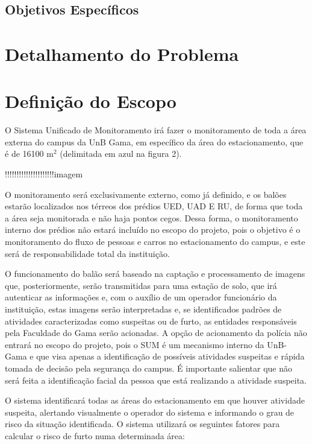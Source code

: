   \subsection{Objetivos Específicos} %
  \label{sub:objetivos_espec_ficos}


\section{Detalhamento do Problema} %
\label{sec:detalhamentoProblema}

\section{Definição do Escopo} %
\label{sec:defini_o_do_escopo}


  O Sistema Unificado de Monitoramento irá fazer o monitoramento de toda a área externa do campus da UnB Gama, em específico da área do estacionamento, que é de 16100 m$^2$ (delimitada em azul na figura 2).

  !!!!!!!!!!!!!!!!!!!!!imagem

  O monitoramento será exclusivamente externo, como já definido, e os balões estarão localizados nos térreos dos prédios UED, UAD E RU, de forma que toda a área seja monitorada e não haja pontos cegos. Dessa forma, o monitoramento interno dos prédios não estará incluído no escopo do projeto, pois o objetivo é o monitoramento do fluxo de pessoas e carros no estacionamento do campus, e este será de responsabilidade total da instituição.

  O funcionamento do balão será baseado na captação e processamento de imagens que, posteriormente, serão transmitidas para uma estação de solo, que irá autenticar as informações e, com o auxílio de um operador funcionário da instituição, estas imagens serão interpretadas e, se identificados padrões de atividades caracterizadas como suspeitas ou de furto, as entidades responsáveis pela Faculdade do Gama serão acionadas. A opção de acionamento da polícia não entrará no escopo do projeto, pois o SUM é um mecanismo interno da UnB-Gama e que visa apenas a identificação de possíveis atividades suspeitas e rápida tomada de decisão pela segurança do campus. É importante salientar que não será feita a identificação facial da pessoa que está realizando a atividade suspeita.

  O sistema identificará todas as áreas do estacionamento em que houver atividade suspeita, alertando visualmente o operador do sistema e informando o grau de risco da situação identificada. O sistema utilizará os seguintes fatores para calcular o risco de furto numa determinada área:

